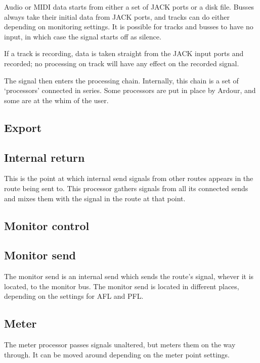 \documentclass[10pt,a4paper]{book}
\begin{document}
Audio or MIDI data starts from either a set of JACK ports or a disk
file.  Busses always take their initial data from JACK ports, and
tracks can do either depending on monitoring settings.  It is possible
for tracks and busses to have no input, in which case the signal
starts off as silence.

If a track is recording, data is taken straight from the JACK input
ports and recorded; no processing on track will have any effect on the
recorded signal.

The signal then enters the processing chain.  Internally, this chain
is a set of `processors' connected in series.  Some processors are put
in place by Ardour, and some are at the whim of the user.

\subsection{Export}


\subsection{Internal return}

This is the point at which internal send signals from other routes
appears in the route being sent to.  This processor gathers signals
from all its connected sends and mixes them with the signal in the
route at that point.

\subsection{Monitor control}


\subsection{Monitor send}

The monitor send is an internal send which sends the route's signal,
whever it is located, to the monitor bus.  The monitor send is located
in different places, depending on the settings for AFL and PFL\@.

\subsection{Meter}

The meter processor passes signals unaltered, but meters them on the
way through.  It can be moved around depending on the meter point settings.
\end{document}
